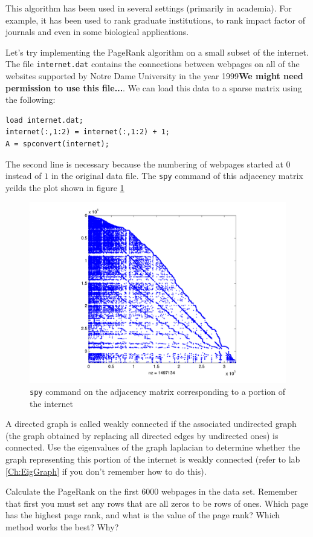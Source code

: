 This algorithm has been used in several settings (primarily in academia). For example, it has been used to rank graduate institutions, to rank impact factor of journals and even in some biological applications.

Let's try implementing the PageRank algorithm on a small subset of the internet. The file {\tt internet.dat} contains the connections between webpages on all of the websites supported by Notre Dame University in the year 1999{\bf We might need permission to use this file...}. We can load this data to a sparse matrix using the following:

\begin{verbatim}
load internet.dat;
internet(:,1:2) = internet(:,1:2) + 1;
A = spconvert(internet);
\end{verbatim}

The second line is necessary because the numbering of webpages started at $0$ instead of $1$ in the original data file. The {\tt spy} command of this adjacency matrix yeilds the plot shown in figure \ref{Fig:WebSparse}

\begin{figure}
\begin{center}
\includegraphics[scale = .4]{./Figures/WebSparse.pdf}
\caption{{\tt spy} command on the adjacency matrix corresponding to a portion of the internet}
\label{Fig:WebSparse}
\end{center}
\end{figure}

\begin{problem}
A directed graph is called weakly connected if the associated undirected graph (the graph obtained by replacing all directed edges by undirected ones) is connected. Use the eigenvalues of the graph laplacian to determine whether the graph representing this portion of the internet is weakly connected (refer to lab \ref{Ch:EigGraph} if you don't remember how to do this).
\end{problem}

\begin{problem}
Calculate the PageRank on the first 6000 webpages in the data set. Remember that first you must set any rows that are all zeros to be rows of ones. Which page has the highest page rank, and what is the value of the page rank? Which method works the best? Why?
\end{problem}

